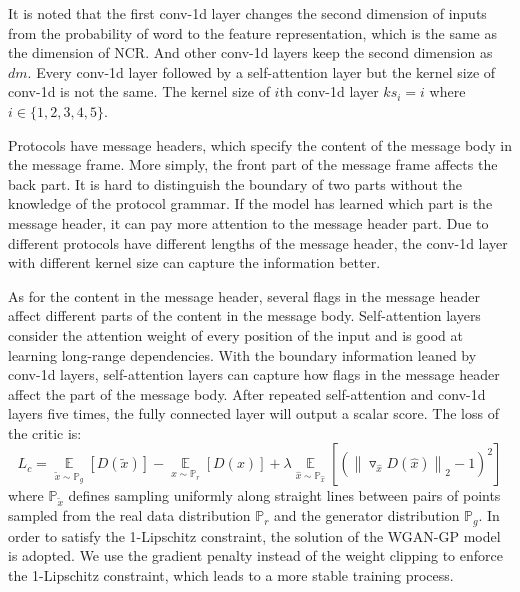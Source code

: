 It is noted that the first conv-1d layer changes the second dimension of inputs from the probability of word to the feature representation, which is the same as the dimension of NCR. And other conv-1d layers keep the second dimension as $dm$. Every conv-1d layer followed by a self-attention layer but the kernel size of conv-1d is not the same. The kernel size of $i$th conv-1d layer $ks_i = i$ where $i \in \{1,2,3,4,5\}$. 

Protocols have message headers, which specify the content of the message body in the message frame. More simply, the front part of the message frame affects the back part. It is hard to distinguish the boundary of two parts without the knowledge of the protocol grammar. If the model has learned which part is the message header, it can pay more attention to the message header part.
Due to different protocols have different lengths of the message header, the conv-1d layer with different kernel size can capture the information better.


As for the content in the message header, several flags in the message header affect different parts of the content in the message body. Self-attention layers consider the attention weight of every position of the input and is good at learning long-range dependencies. With the boundary information leaned by conv-1d layers, self-attention layers can capture how flags in the message header affect the part of the message body. After repeated self-attention and conv-1d layers five times, the fully connected layer will output a scalar score. The loss of the critic is:
\begin{equation}
L_{c} = \mathop{\mathbb{E}}\limits_{\tilde{x}\sim\mathbb{P}_{g}}\left [ D(\tilde{x}) \right ] 
- \mathop{\mathbb{E}}\limits_{x\sim\mathbb{P}_{r}}\left [ D(x) \right ] 
+ \lambda\mathop{\mathbb{E}}\limits_{\hat{x}\sim\mathbb{P}_{\hat{x}}}\left [ ( \left \| \triangledown_{\hat{x}}D( \hat{x}) \right \|_{2} - 1 )^{2} \right ]
\end{equation}
where $\mathbb{P}_{\tilde{x}}$ defines sampling uniformly along straight lines between pairs of points sampled from the real data distribution $\mathbb{P}_{r}$ and the generator distribution $\mathbb{P}_{g}$. 
In order to satisfy the 1-Lipschitz constraint, the solution of the WGAN-GP model is adopted. 
We use the gradient penalty instead of the weight clipping to enforce the 1-Lipschitz constraint, which leads to a more stable training process.%

